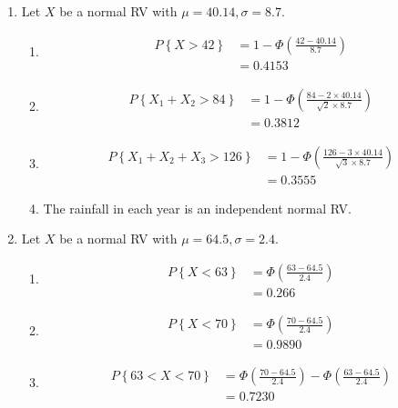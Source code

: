 \begin{enumerate}
	
	\item Let $ X $ be a normal RV with $ \mu = 40.14, \sigma = 8.7 $.
			
		\begin{enumerate}
			\item \begin{align}
				P \left\{X > 42\right\} &= 1 - \Phi \left(\frac{42 - 40.14}{8.7}\right) \nonumber \\
				&= 0.4153
			\end{align}
			
			\item \begin{align}
				P \left\{X_1 + X_2 > 84\right\} &= 1 - \Phi \left(\frac{84 - 2 \times 40.14}{\sqrt{2} \times 8.7}\right) \nonumber \\
				&= 0.3812
			\end{align}
			
			\item \begin{align}
				P \left\{X_1 + X_2 +X_3 > 126\right\} &= 1 - \Phi \left(\frac{126 - 3 \times 40.14}{\sqrt{3} \times 8.7}\right) \nonumber \\
				&= 0.3555
			\end{align}
			
			\item The rainfall in each year is an independent normal RV.
		\end{enumerate}
	
	
	\item Let $ X $ be a normal RV with $ \mu = 64.5, \sigma = 2.4 $.
			
		\begin{enumerate}
			\item \begin{align}
				P \left\{X < 63\right\} &= \Phi \left(\frac{63 - 64.5}{2.4}\right) \nonumber \\
				&= 0.266
			\end{align}
			
			\item \begin{align}
				P \left\{X < 70\right\} &= \Phi \left(\frac{70 - 64.5}{2.4}\right) \nonumber \\
				&= 0.9890
			\end{align}
			
			\item \begin{align}
				P \left\{63 < X < 70\right\} &= \Phi \left(\frac{70 - 64.5}{2.4}\right) - \Phi \left(\frac{63 - 64.5}{2.4}\right) \nonumber \\
				&= 0.7230
			\end{align}
			

\end{enumerate}
\end{enumerate}
